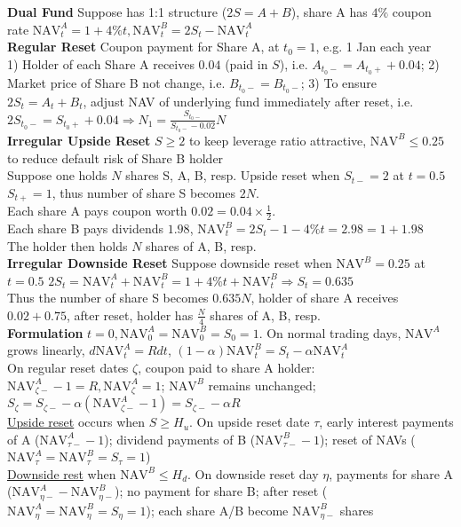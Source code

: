 \documentclass[12pt,landscape, a4paper]{article}
\theoremstyle{remark}
\newcommand{\NAV}{\mathrm{NAV}}
\begin{document}
\begin{multicols*}{3}
\textbf{Dual Fund} Suppose has 1:1 structure ($2S = A+B$), share A has $4\%$ coupon rate $\NAV^A_t = 1+4\%t, \NAV^B_t = 2S_t - \NAV^A_t$\\
\textbf{Regular Reset} Coupon payment for Share A, at $t_0 = 1$, e.g. 1 Jan each year\\
1) Holder of each Share A receives $0.04$ (paid in $S$), i.e. $A_{t_0-} = A_{t_0+} + 0.04$; 2) Market price of Share B not change, i.e. $ B_{t_0-} = B_{t_0-}$; 3) To ensure $2S_t = A_t + B_t$, adjust NAV of underlying fund immediately after reset, i.e. $2S_{t_0-} = S_{t_0 +} +0.04 \Rightarrow N_1 = \frac{S_{t_0-}}{S_{t_0-} - 0.02}N$\\
\textbf{Irregular Upside Reset} $S\geq 2$ to keep leverage ratio attractive, $\NAV^B \leq 0.25$ to reduce default risk of Share B holder\\
Suppose one holds $N$ shares S, A, B, resp. Upside reset when $S_{t-} = 2$ at $t=0.5$\\
$S_{t+} = 1$, thus number of share S becomes $2N$.\\
Each share A pays coupon worth $0.02 = 0.04\times \frac{1}{2}$.\\
Each share B pays dividends $1.98$, $\NAV^B_t = 2S_{t} -1 - 4\% t= 2.98 = 1+1.98 $\\
The holder then holds $N$ shares of A, B, resp.\\

\textbf{Irregular Downside Reset} Suppose downside reset when $\NAV^B = 0.25$ at $t=0.5$
$2S_t = \NAV^A_t+\NAV^B_t = 1+4\%t + \NAV^B_t \Rightarrow S_t = 0.635$\\
Thus the number of share S becomes $0.635N$, holder of share A receives $0.02+0.75$, after reset, holder has $\frac{N}{4}$ shares of A, B, resp.\\

\textbf{Formulation} $t=0, \NAV^A_0 = \NAV^B_0 = S_0 = 1$. On normal trading days, $\NAV^A$ grows linearly, $d \NAV^A_t = Rdt$, $(1-\alpha) \NAV^B_t = S_t - \alpha \NAV^A_t$\\
On regular reset dates $\zeta$, coupon paid to share A holder: $\NAV^A_{\zeta-} - 1 = R, \NAV^A_\zeta=1$; $\NAV^B$ remains unchanged; $S_\zeta = S_{\zeta-} - \alpha (\NAV^A_{\zeta-} -1 ) = S_{\zeta-} - \alpha R$\\
\underline{Upside reset} occurs when $S \geq H_u$. On upside reset date $\tau$, early interest payments of A ($\NAV^A_{\tau-}-1$); dividend payments of B ($\NAV^B_{\tau-} -1$); reset of NAVs ($\NAV^A_\tau = \NAV^B_\tau = S_\tau = 1$)\\
\underline{Downside rest} when $\NAV^B \leq H_d$. On downside reset day $\eta$, payments for share A ($\NAV^A_{\eta-} - \NAV^B_{\eta -}$); no payment for share B; after reset ($\NAV^A_\eta = \NAV^B_\eta = S_\eta = 1$); each share A/B become $\NAV^B_{\eta-}$ shares\\


\end{multicols*}
\end{document}
